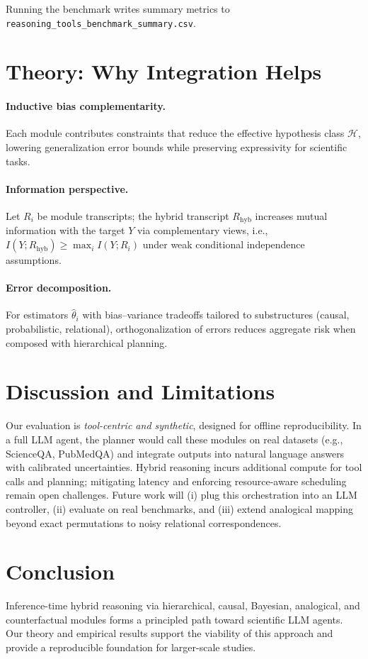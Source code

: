 \documentclass[11pt]{article}
\begin{document}
Running the benchmark writes summary metrics to \texttt{reasoning_tools_benchmark_summary.csv}.
\section{Theory: Why Integration Helps}
\paragraph{Inductive bias complementarity.}
Each module contributes constraints that reduce the effective hypothesis class $\mathcal{H}$, lowering generalization error bounds while preserving expressivity for scientific tasks.
\paragraph{Information perspective.}
Let $R_i$ be module transcripts; the hybrid transcript $R_\mathrm{hyb}$ increases mutual information with the target $Y$ via complementary views, i.e., $I(Y;R_\mathrm{hyb}) \ge \max_i I(Y;R_i)$ under weak conditional independence assumptions.
\paragraph{Error decomposition.}
For estimators $\hat{\theta}_i$ with bias--variance tradeoffs tailored to substructures (causal, probabilistic, relational), orthogonalization of errors reduces aggregate risk when composed with hierarchical planning.

\section{Discussion and Limitations}
Our evaluation is \emph{tool-centric and synthetic}, designed for offline reproducibility. In a full LLM agent, the planner would call these modules on real datasets (e.g., ScienceQA, PubMedQA) and integrate outputs into natural language answers with calibrated uncertainties. Hybrid reasoning incurs additional compute for tool calls and planning; mitigating latency and enforcing resource-aware scheduling remain open challenges. Future work will (i) plug this orchestration into an LLM controller, (ii) evaluate on real benchmarks, and (iii) extend analogical mapping beyond exact permutations to noisy relational correspondences.

\section{Conclusion}
Inference-time hybrid reasoning via hierarchical, causal, Bayesian, analogical, and counterfactual modules forms a principled path toward scientific LLM agents. Our theory and empirical results support the viability of this approach and provide a reproducible foundation for larger-scale studies.



\end{document}
